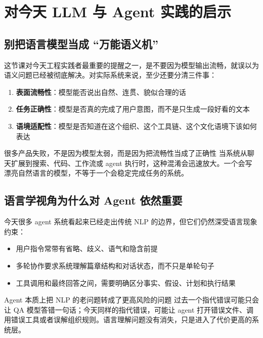 \section{对今天 LLM 与 Agent 实践的启示}

\subsection{别把语言模型当成 ``万能语义机''}

这节课对今天工程实践者最重要的提醒之一，是不要因为模型输出流畅，就误以为语义问题已经被彻底解决。对实际系统来说，至少还要分清三件事：

\begin{enumerate}
    \item \textbf{表面流畅性}：模型能否说出自然、连贯、貌似合理的话
    \item \textbf{任务正确性}：模型是否真的完成了用户意图，而不是只生成一段好看的文本
    \item \textbf{语境适配性}：模型是否知道在这个组织、这个工具链、这个文化语境下该如何表达
\end{enumerate}

\begin{warningbox}{很多产品失败，不是因为模型太弱，而是因为把流畅性当成了正确性}
当系统从聊天扩展到搜索、代码、工作流或 agent 执行时，这种混淆会迅速放大。一个会写漂亮自然语言的模型，不等于一个会稳定完成任务的系统。
\end{warningbox}

\subsection{语言学视角为什么对 Agent 依然重要}

今天很多 agent 系统看起来已经走出传统 NLP 的边界，但它们仍然深受语言现象约束：

\begin{itemize}
    \item 用户指令常带有省略、歧义、语气和隐含前提
    \item 多轮协作要求系统理解篇章结构和对话状态，而不只是单轮句子
    \item 工具调用和最终回答之间，需要明确区分事实、假设、计划和执行结果
\end{itemize}

\begin{knowledgebox}{Agent 本质上把 NLP 的老问题转成了更高风险的问题}
过去一个指代错误可能只会让 QA 模型答错一句话；今天同样的指代错误，可能让 agent 打开错误文件、调用错误工具或者误解组织规则。语言理解问题没有消失，只是进入了代价更高的系统层。
\end{knowledgebox}

